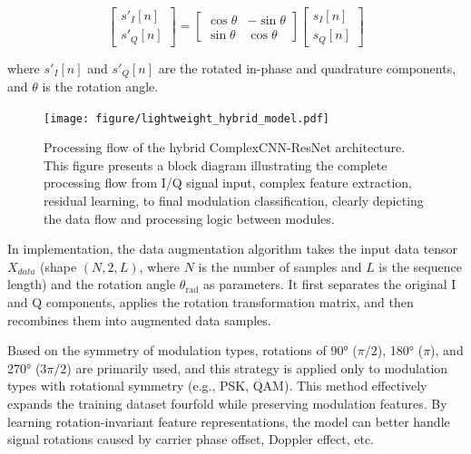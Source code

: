 \documentclass[conference]{IEEEtran}
\begin{document}
\begin{equation}
\begin{bmatrix} s'_I[n] \\ s'_Q[n] \end{bmatrix} = \begin{bmatrix} \cos\theta & -\sin\theta \\ \sin\theta & \cos\theta \end{bmatrix} \begin{bmatrix} s_I[n] \\ s_Q[n] \end{bmatrix}
\end{equation}

where \(s'_I[n]\) and \(s'_Q[n]\) are the rotated in-phase and quadrature components, and \(\theta\) is the rotation angle.


\begin{figure}[htbp]
\centering
\texttt{[image: figure/lightweight\_hybrid\_model.pdf]}
\caption{Processing flow of the hybrid ComplexCNN-ResNet architecture. This figure presents a block diagram illustrating the complete processing flow from I/Q signal input, complex feature extraction, residual learning, to final modulation classification, clearly depicting the data flow and processing logic between modules.}
\label{fig:lightweight_hybrid_model_flow}
\end{figure}


In implementation, the data augmentation algorithm takes the input data tensor \(X_{data}\) (shape \((N, 2, L)\), where \(N\) is the number of samples and \(L\) is the sequence length) and the rotation angle \(\theta_{\text{rad}}\) as parameters. It first separates the original I and Q components, applies the rotation transformation matrix, and then recombines them into augmented data samples.

Based on the symmetry of modulation types, rotations of 90° (\(\pi/2\)), 180° (\(\pi\)), and 270° (\(3\pi/2\)) are primarily used, and this strategy is applied only to modulation types with rotational symmetry (e.g., PSK, QAM). This method effectively expands the training dataset fourfold while preserving modulation features. By learning rotation-invariant feature representations, the model can better handle signal rotations caused by carrier phase offset, Doppler effect, etc.


\end{document}
